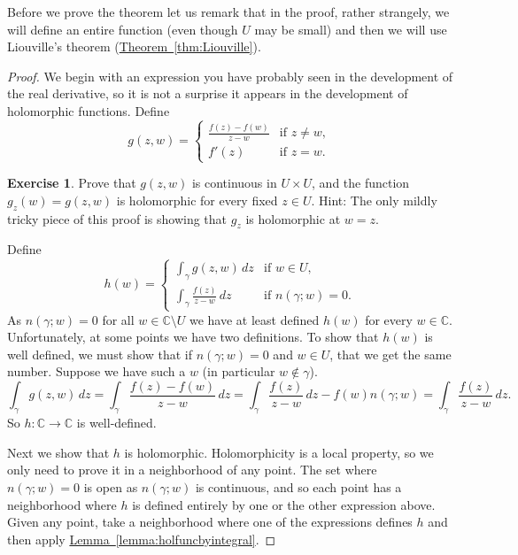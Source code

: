 \documentclass[12pt,openany]{book}
\newcommand{\C}{{\mathbb{C}}}
\theoremstyle{plain}
\theoremstyle{remark}
\theoremstyle{definition}
\newenvironment{exbox}{%
    \def\FrameCommand{\vrule width 1pt \relax\hspace{10pt}}%
    \MakeFramed{\advance\hsize-\width\FrameRestore}%
}{%
    \endMakeFramed
}
\theoremstyle{exercise}
\newtheorem{exercise}{Exercise}[section]
\theoremstyle{example}
\newcommand{\thmref}[1]{\hyperref[#1]{Theorem~\ref*{#1}}}
\newcommand{\lemmaref}[1]{\hyperref[#1]{Lemma~\ref*{#1}}}
\begin{document}
Before we prove the theorem let us remark
that in the proof, rather strangely, we will define an entire
function (even though $U$ may be small) and then we will use
Liouville's theorem (\thmref{thm:Liouville}).

\begin{proof}
We begin with an expression you have probably seen in the development of the real
derivative, so it is not a surprise it appears in the development of
holomorphic functions.
Define
\begin{equation*}
g(z,w) =
\begin{cases}
\frac{f(z)-f(w)}{z-w} & \text{if } z \not= w , \\
f'(z)                 & \text{if } z = w .
\end{cases}
\end{equation*}

\begin{exbox}
\begin{exercise}
Prove that $g(z,w)$ is continuous in $U \times U$, and 
the function $g_z(w) = g(z,w)$ is holomorphic for every fixed $z \in U$.
Hint: The only mildly tricky piece of this proof is showing that $g_z$ is
holomorphic at $w=z$.
\end{exercise}
\end{exbox}

Define
\begin{equation*}
h(w) = 
\begin{cases}
\int_\gamma g(z,w) \, dz & \text{if } w \in U , \\
\int_\gamma \frac{f(z)}{z-w} \, dz & \text{if } n(\gamma;w) = 0 .
\end{cases}
\end{equation*}
As $n(\gamma;w) = 0$ for all $w \in \C \setminus U$ we have at least
defined $h(w)$ for every $w \in \C$.  Unfortunately, at some points
we have two definitions.
To show that $h(w)$ is well defined, we must show that if
$n(\gamma;w) = 0$ and $w \in U$, that we get the same number.
Suppose
we have such a $w$ (in particular $w \notin \gamma$).
\begin{equation*}
\int_\gamma g(z,w) \, dz
=
\int_\gamma \frac{f(z)-f(w)}{z-w} \, dz
=
\int_\gamma \frac{f(z)}{z-w} \, dz
-
f(w) n(\gamma;w)
=
\int_\gamma \frac{f(z)}{z-w} \, dz .
\end{equation*}
So $h \colon \C \to \C$ is well-defined.

Next we show that $h$ is
holomorphic.
Holomorphicity is a local property, so we only need to prove it 
in a neighborhood of any point.
The set where $n(\gamma;w) = 0$ is open as $n(\gamma;w)$ is
continuous, and so each point has a neighborhood where $h$ is defined
entirely by one or the other expression above.  Given any point,
take a neighborhood where one of the expressions defines
$h$ and then apply \lemmaref{lemma:holfuncbyintegral}.


\end{proof}
\end{document}
